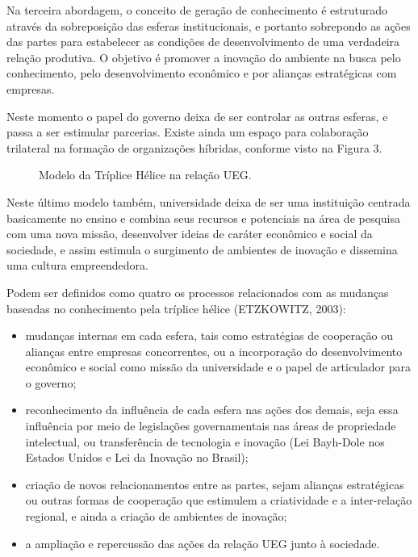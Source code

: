Na terceira abordagem, o conceito de geração de conhecimento é estruturado através da sobreposição das esferas institucionais, e portanto sobrepondo as ações das partes para estabelecer as condições de desenvolvimento de uma verdadeira relação produtiva. O objetivo é promover a inovação do ambiente na busca pelo conhecimento, pelo desenvolvimento econômico e por alianças estratégicas com empresas.

Neste momento o papel do governo deixa de ser controlar as outras esferas, e passa a ser estimular parcerias. Existe ainda um espaço para colaboração trilateral na formação de organizações híbridas, conforme visto na Figura 3.


\begin{figure}[ht]
  \centering
  \caption{Modelo da Tríplice Hélice na relação UEG.}
  \label{crescimento_odf}
\end{figure}

Neste último modelo também, universidade deixa de ser uma instituição centrada basicamente no ensino e combina seus recursos e potenciais na área de pesquisa com uma nova missão, desenvolver ideias de caráter econômico e social da sociedade, e assim estimula o surgimento de ambientes de inovação e dissemina uma cultura empreendedora.

Podem ser definidos como quatro os processos relacionados com as mudanças baseadas no conhecimento pela tríplice hélice (ETZKOWITZ, 2003):

\begin{itemize}
  \item{mudanças internas em cada esfera, tais como estratégias de cooperação ou alianças entre empresas concorrentes, ou a incorporação do desenvolvimento econômico e social como missão da universidade e o papel de articulador para o governo;}
  \item{reconhecimento da influência de cada esfera nas ações dos demais, seja essa influência por meio de legislações governamentais nas áreas de propriedade intelectual, ou transferência de tecnologia e inovação (Lei Bayh-Dole nos Estados Unidos e Lei da Inovação no Brasil);}
  \item{criação de novos relacionamentos entre as partes, sejam alianças estratégicas ou outras formas de cooperação que estimulem a criatividade e a inter-relação regional, e ainda a criação de ambientes de inovação;}
  \item{a ampliação e repercussão das ações da relação UEG junto à sociedade.}
\end{itemize}

